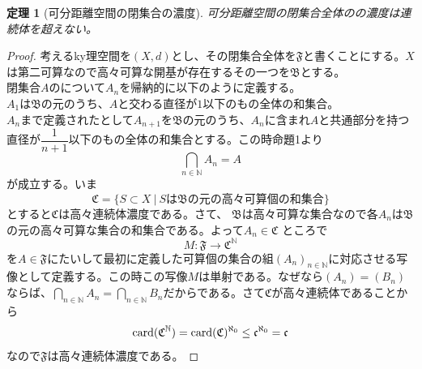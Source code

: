 \documentclass{jsarticle}
\newtheorem{thm}{定理}
\newcommand{\nn}{\mathbb{N}}
\newcommand{\dpst}{\displaystyle}
\newcommand{\bb}{\mathfrak{B}}
\newcommand{\ccc}{\mathfrak{C}}
\newcommand{\ff}{\mathfrak{F}}
\newcommand{\card}{\text{{\rm card}}}
\begin{document}
\begin{thm}[可分距離空間の閉集合の濃度]
可分距離空間の閉集合全体のの濃度は連続体を超えない。

\end{thm}
\begin{proof}考えるky理空間を$(X,d)$とし、その閉集合全体を$\ff$と書くことにする。$X$は第二可算なので高々可算な開基が存在するその一つを$\bb$とする。\\ 
閉集合$A$のについて$A_n$を帰納的に以下のように定義する。\\ 
$A_1$は$\bb$の元のうち、$A$と交わる直径が$1$以下のもの全体の和集合。\\ 
$A_n$まで定義されたとして$A_{n+1}$を$\bb$の元のうち、$A_n$に含まれ$A$と共通部分を持つ直径が$\dfrac{1}{n+1}$以下のもの全体の和集合とする。この時命題1より
\[
\bigcap_{n\in \nn}A_n=A
\]
が成立する。いま
\[
\ccc=\{S\subset X\ |\ Sは\bb の元の高々可算個の和集合\}
\]とすると$\ccc$は高々連続体濃度である。さて、
$\bb$は高々可算な集合なので各$A_n$は$\bb$の元の高々可算な集合の和集合である。よって$A_n\in \ccc$
ところで
\[
M: \ff \to \ccc^\nn 
\]
を$A\in \ff$にたいして最初に定義した可算個の集合の組$(A_n)_{n\in \nn}$に対応させる写像として定義する。この時この写像$M$は単射である。なぜなら$(A_n)=(B_n)$ならば、$\dpst \bigcap_{n\in \nn}A_n=\bigcap_{n\in \nn}B_n$だからである。さて$\ccc$が高々連続体であることから
\[
\card(\ccc^{\nn})=\card(\ccc)^{\aleph_0}\le \mathfrak{c}^{\aleph_0}=\mathfrak{c}
\]
なので$\ff$は高々連続体濃度である。

\end{proof}


























	





			
\end{document}
